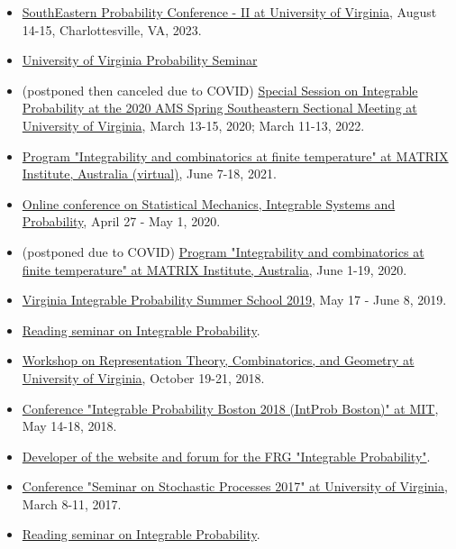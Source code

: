 \documentclass[letterpaper,11pt]{article}
\begin{document}
\begin{itemize}
\item [2023:]
\href{https://sites.google.com/view/sepc2023ii/sepc-2023-ii}{SouthEastern Probability Conference - II at University of Virginia},
August 14-15, Charlottesville, VA, 2023.

\item [2014-current:]
\href{http://math.virginia.edu/seminars/probability/}{University of Virginia Probability Seminar}

\item [2020, 2022:]
(postponed then canceled due to COVID)
\href{http://www.ams.org/meetings/sectional/2273_program.html}{Special Session on Integrable Probability at the 2020 AMS Spring Southeastern Sectional Meeting at University of Virginia},
March 13-15, 2020; March 11-13, 2022.

\item [2021:]
\href{https://www.matrix-inst.org.au/events/integrability-and-combinatorics-at-finite-temperature/}{Program "Integrability and combinatorics at finite temperature" at MATRIX Institute, Australia (virtual)},
June 7-18, 2021.

\item [2020:]
\href{http://mtikhonov.com/smisp/}{Online conference on Statistical Mechanics, Integrable Systems and Probability},
April 27 - May 1, 2020.

\item [2020:]
(postponed due to COVID)
\href{https://www.matrix-inst.org.au/events/integrability-and-combinatorics-at-finite-temperature/}{Program "Integrability and combinatorics at finite temperature" at MATRIX Institute, Australia},
June 1-19, 2020.

\item [2019:]
\href{http://vipss.int-prob.org/}{Virginia Integrable Probability Summer School 2019},
May 17 - June 8, 2019.

\item[2018-19:]
\href{https://lpetrov.cc/reading-2019/}{Reading seminar on Integrable Probability}.

\item [2018:]
\href{http://math.virginia.edu/ims/workshop-fall-2018/}{Workshop on Representation Theory, Combinatorics, and Geometry at University of Virginia},
October 19-21, 2018.

\item [2018:]
\href{http://frg.int-prob.org/conference2018/}{Conference "Integrable Probability Boston 2018 (IntProb Boston)" at MIT},
May 14-18, 2018.

\item [2017+:]
\href{http://frg.int-prob.org/}{Developer of the website and forum for the FRG "Integrable Probability"}.

\item [2017:]
\href{http://faculty.virginia.edu/ssp17/}{Conference "Seminar on Stochastic Processes 2017" at University of Virginia},
March 8-11, 2017.

\item [2016-17:]
\href{https://lpetrov.cc/2016/12/reading-seminar/}{Reading seminar on Integrable Probability}.
\end{itemize}
\end{document}
